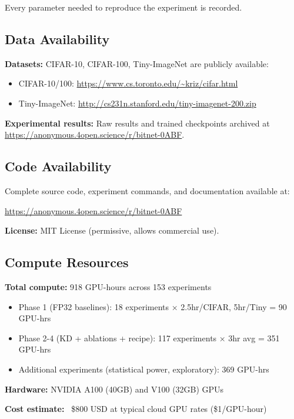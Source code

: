 Every parameter needed to reproduce the experiment is recorded.

\subsection{Data Availability}

\textbf{Datasets:} CIFAR-10, CIFAR-100, Tiny-ImageNet are publicly available:
\begin{itemize}
    \item CIFAR-10/100: \url{https://www.cs.toronto.edu/~kriz/cifar.html}
    \item Tiny-ImageNet: \url{http://cs231n.stanford.edu/tiny-imagenet-200.zip}
\end{itemize}

\textbf{Experimental results:} Raw results and trained checkpoints archived at \url{https://anonymous.4open.science/r/bitnet-0ABF}.

\subsection{Code Availability}

Complete source code, experiment commands, and documentation available at:
\begin{center}
\url{https://anonymous.4open.science/r/bitnet-0ABF}
\end{center}

\textbf{License:} MIT License (permissive, allows commercial use).

\subsection{Compute Resources}

\textbf{Total compute:} 918 GPU-hours across 153 experiments
\begin{itemize}
    \item Phase 1 (FP32 baselines): 18 experiments × 2.5hr/CIFAR, 5hr/Tiny = 90 GPU-hrs
    \item Phase 2-4 (KD + ablations + recipe): 117 experiments × 3hr avg = 351 GPU-hrs
    \item Additional experiments (statistical power, exploratory): 369 GPU-hrs
\end{itemize}

\textbf{Hardware:} NVIDIA A100 (40GB) and V100 (32GB) GPUs

\textbf{Cost estimate:} ~\$800 USD at typical cloud GPU rates (\$1/GPU-hour)


